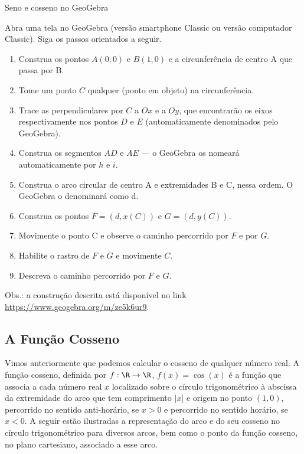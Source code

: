 \begin{task}{Seno e cosseno no GeoGebra}
\label{trig-ativ17}

Abra uma tela no GeoGebra (versão smartphone Classic ou versão computador Classic). Siga os passos orientados a seguir.
\begin{enumerate}
\item Construa os pontos $A(0,0)$ e $B(1,0)$ e a circunferência de centro A que passa por B.
\item Tome um ponto $C$ qualquer (ponto em objeto) na circunferência.
\item Trace as perpendiculares por $C$ a $Ox$ e a $Oy$, que encontrarão os eixos respectivamente nos pontos $D$ e $E$ (automaticamente denominados pelo GeoGebra).
\item Construa os segmentos $AD$ e $AE$ --- o GeoGebra os nomeará automaticamente por $h$ e $i$.
\item Construa o arco circular de centro A e extremidades B e C, nessa ordem. O GeoGebra o denominará como d.
\item Construa os pontos $F=(d,x(C))$ e $G=(d,y(C))$.
\item Movimente o ponto C e observe o caminho percorrido por $F$ e por $G$.
\item Habilite o rastro de $F$ e $G$ e movimente $C$.
\item Descreva o caminho percorrido por $F$ e $G$.
\end{enumerate}

Obs.: a construção descrita está disponível no link \url{https://www.geogebra.org/m/ze5k6ur9}.
\end{task}

\subsection{A Função Cosseno}

Vimos anteriormente que podemos calcular o cosseno de qualquer número real. A função cosseno, definida por $f:\R\to\R$, $f(x) = \cos(x)$ é a função que associa a cada número real $x$ localizado sobre o círculo trigonométrico à abscissa da extremidade do arco que tem comprimento $|x|$ e origem no ponto $(1,0)$, percorrido no sentido anti-horário, se $x>0$ e percorrido no sentido horário, se $x<0$. A seguir estão ilustradas a representação do arco e do seu cosseno no círculo trigonométrico para diversos arcos, bem como o ponto da função cosseno, no plano cartesiano, associado a esse arco.

